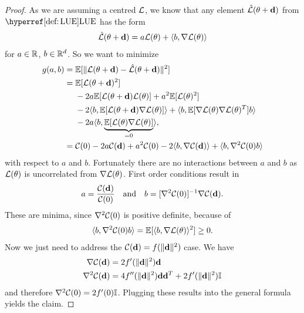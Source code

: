 \begin{proof}
	As we are assuming a centred \(\mathcal{L}\), we know that any  element
	\(\hat{\mathcal{L}}(\theta + \mathbf{d})\) from \(\LUE\) has the form
	\begin{align*}
		\hat{\mathcal{L}}(\theta + \mathbf{d})
		= a\mathcal{L}(\theta) + \langle b, \nabla\mathcal{L}(\theta)\rangle
	\end{align*}
	for \(a\in\mathbb{R}\), \(b\in \mathbb{R}^d\). So we want to minimize 
	\begin{align*}
		g(a,b)
		&=\mathbb{E}[\|\mathcal{L}(\theta +\mathbf{d}) - \hat{\mathcal{L}}(\theta + \mathbf{d})\|^2]\\
		&= \begin{aligned}[t]
			&\mathbb{E}[\mathcal{L}(\theta +\mathbf{d})^2]\\
			&- 2a\mathbb{E}[\mathcal{L}(\theta + \mathbf{d})\mathcal{L}(\theta)] + a^2 \mathbb{E}[\mathcal{L}(\theta)^2]\\
			&- 2\langle b, \mathbb{E}[\mathcal{L}(\theta + \mathbf{d})\nabla\mathcal{L}(\theta)]\rangle
			+ \langle b, \mathbb{E}[\nabla\mathcal{L}(\theta)\nabla\mathcal{L}(\theta)^T] b\rangle\\
			&- 2a\langle b, \underbrace{\mathbb{E}[\mathcal{L}(\theta)\nabla\mathcal{L}(\theta)]}_{=0}\rangle,
		\end{aligned}\\
		&=\mathcal{C}(0) - 2a\mathcal{C}(\mathbf{d}) + a^2 \mathcal{C}(0)
		- 2\langle b, \nabla\mathcal{C}(\mathbf{d})\rangle
		+ \langle b, \nabla^2\mathcal{C}(0) b\rangle
	\end{align*}
	with respect to \(a\) and \(b\). Fortunately there are no interactions
	between \(a\) and \(b\) as \(\mathcal{L}(\theta)\) is uncorrelated from
	\(\nabla\mathcal{L}(\theta)\). First order conditions result in
	\begin{align*}
		a= \frac{\mathcal{C}(\mathbf{d})}{\mathcal{C}(0)}
		\quad \text{and} \quad
		b = [\nabla^2 \mathcal{C}(0)]^{-1}\nabla \mathcal{C}(\mathbf{d}).
	\end{align*}
	These are minima, since \(\nabla^2\mathcal{C}(0)\) is positive definite, because of
	\begin{align*}
		\langle b, \nabla^2\mathcal{C}(0) b\rangle = \mathbb{E}[\langle b, \nabla\mathcal{L}(\theta)\rangle^2] \ge 0.
	\end{align*}
	Now we just need to address the \(\mathcal{C}(\mathbf{d}) = f(\|\mathbf{d}\|^2)\) case. We have
	\begin{align*}
		\nabla \mathcal{C}(\mathbf{d}) &= 2f'(\|\mathbf{d}\|^2) \mathbf{d}\\
		\nabla^2 \mathcal{C}(\mathbf{d}) &= 4 f''(\|\mathbf{d}\|^2) \mathbf{d} \mathbf{d}^T + 2f'(\|\mathbf{d}\|^2)\mathbb{I}
	\end{align*}
	and therefore \(\nabla^2\mathcal{C}(0) = 2f'(0)\mathbb{I}\). Plugging these results
	into the general formula yields the claim.
\end{proof}

